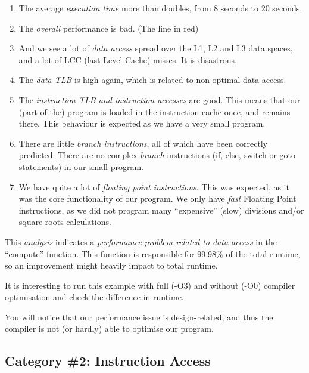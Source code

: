 \begin{enumerate}
  \item The average \emph{execution time} more than doubles, from 8 seconds to 20 seconds.
  \item The \emph{overall} performance is bad. (The line in red)
  \item And we see a lot of \emph{data access} spread over the L1, L2 and L3 data spaces, and a lot of LCC (last Level Cache) misses. It is disastrous.
  \item The \emph{data TLB} is high again, which is related to non-optimal data access.
  \item The \emph{instruction TLB and instruction accesses} are good. This means that our (part of the) program is loaded in the instruction cache once, and remains there. This behaviour is expected as we have a very small program.
  \item There are little \emph{branch instructions}, all of which have been correctly predicted. There are no complex \emph{branch} instructions (if, else, switch or goto statements) in our small program.
  \item We have quite a lot of \emph{floating point instructions}. This was expected, as it was the core functionality of our program. We only have \emph{fast} Floating Point instructions, as we did not program many ``expensive'' (slow) divisions and/or square-roots calculations.
\end{enumerate}

This \emph{analysis} indicates a \emph{performance problem related to data access} in the ``compute'' function. This function is responsible for 99.98\% of the total runtime, so an improvement might heavily impact to total runtime.

\begin{tip}
It is interesting to run this example with full (-O3) and without (-O0) compiler optimisation and check the difference in runtime.
\end{tip}

\begin{prompt}
\end{prompt}

You will notice that our performance issue is design-related, and thus the compiler is not (or hardly) able to optimise our program.

\subsection{Category \#2: Instruction Access}
\label{ch02:subsec:CAT2_Instruction_Access}

